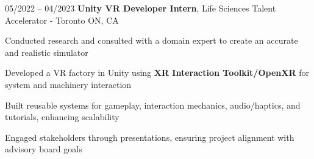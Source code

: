 \begin{twocolentry}{
    05/2022 – 04/2023
}
\fontsize{11 pt}{11 pt}\textbf{Unity VR Developer Intern}, Life Sciences Talent Accelerator - Toronto ON, CA\end{twocolentry}

\vspace{0.10 cm}
\begin{onecolentry}
    \begin{highlights}
        \item Conducted research and consulted with a domain expert to create an accurate and realistic simulator
        \item Developed a VR factory in Unity using \textbf{XR Interaction Toolkit/OpenXR} for system and machinery interaction
        \item Built reusable systems for gameplay, interaction mechanics, audio/haptics, and tutorials, enhancing scalability
        \item Engaged stakeholders through presentations, ensuring project alignment with advisory board goals
    \end{highlights}
\end{onecolentry}